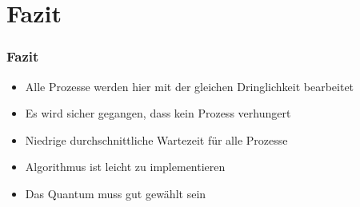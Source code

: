 \section{Fazit}

\begin{frame}
    \frametitle{Fazit}

    \begin{itemize}
        \item Alle Prozesse werden hier mit der gleichen Dringlichkeit bearbeitet
        \item Es wird sicher gegangen, dass kein Prozess verhungert
        \item Niedrige durchschnittliche Wartezeit für alle Prozesse
        \item Algorithmus ist leicht zu implementieren
        \item Das Quantum muss gut gewählt sein
    \end{itemize}

\end{frame}
